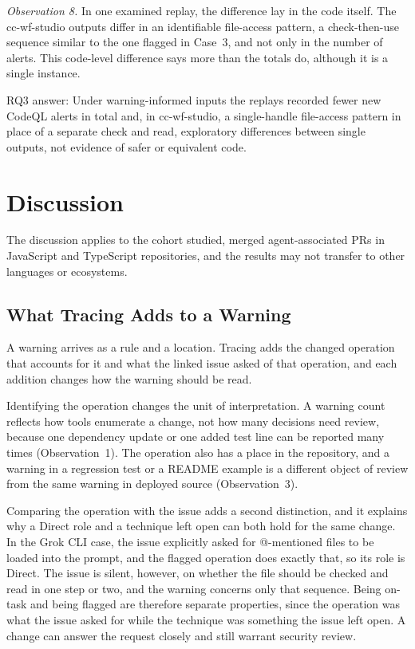 \documentclass[acmsmall,screen,nonacm,review]{acmart}
\begin{document}
\emph{Observation 8.} In one examined replay, the difference lay in the code itself. The cc-wf-studio outputs differ in an identifiable file-access pattern, a check-then-use sequence similar to the one flagged in Case~3, and not only in the number of alerts. This code-level difference says more than the totals do, although it is a single instance.

RQ3 answer: Under warning-informed inputs the replays recorded fewer new CodeQL alerts in total and, in cc-wf-studio, a single-handle file-access pattern in place of a separate check and read, exploratory differences between single outputs, not evidence of safer or equivalent code.

\section{Discussion}\label{sec:discussion}

The discussion applies to the cohort studied, merged agent-associated PRs in JavaScript and TypeScript repositories, and the results may not transfer to other languages or ecosystems.

\subsection{What Tracing Adds to a Warning}

A warning arrives as a rule and a location. Tracing adds the changed operation that accounts for it and what the linked issue asked of that operation, and each addition changes how the warning should be read.

Identifying the operation changes the unit of interpretation. A warning count reflects how tools enumerate a change, not how many decisions need review, because one dependency update or one added test line can be reported many times (Observation~1). The operation also has a place in the repository, and a warning in a regression test or a README example is a different object of review from the same warning in deployed source (Observation~3).

Comparing the operation with the issue adds a second distinction, and it explains why a Direct role and a technique left open can both hold for the same change. In the Grok CLI case, the issue explicitly asked for @-mentioned files to be loaded into the prompt, and the flagged operation does exactly that, so its role is Direct. The issue is silent, however, on whether the file should be checked and read in one step or two, and the warning concerns only that sequence. Being on-task and being flagged are therefore separate properties, since the operation was what the issue asked for while the technique was something the issue left open. A change can answer the request closely and still warrant security review.
\end{document}
